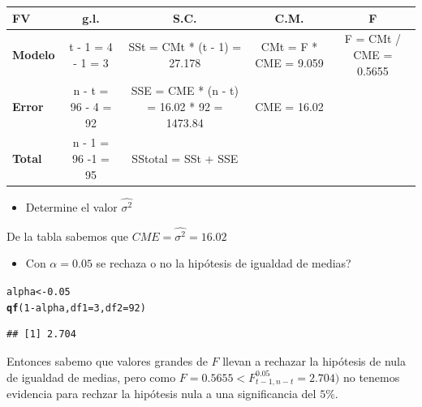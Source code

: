 \documentclass[a4paper]{scrartcl}\usepackage[]{graphicx}\usepackage[]{color}
\makeatletter
\newcommand{\hlnum}[1]{\textcolor[rgb]{0.686,0.059,0.569}{#1}}%
\newcommand{\hlopt}[1]{\textcolor[rgb]{0,0,0}{#1}}%
\newcommand{\hlstd}[1]{\textcolor[rgb]{0.345,0.345,0.345}{#1}}%
\newcommand{\hlkwb}[1]{\textcolor[rgb]{0.69,0.353,0.396}{#1}}%
\newcommand{\hlkwc}[1]{\textcolor[rgb]{0.333,0.667,0.333}{#1}}%
\newcommand{\hlkwd}[1]{\textcolor[rgb]{0.737,0.353,0.396}{\textbf{#1}}}%
\newenvironment{kframe}{%
 \def\at@end@of@kframe{}%
 \ifinner\ifhmode%
  \def\at@end@of@kframe{\end{minipage}}%
  \begin{minipage}{\columnwidth}%
 \fi\fi%
 \def\FrameCommand##1{\hskip\@totalleftmargin \hskip-\fboxsep
 \colorbox{shadecolor}{##1}\hskip-\fboxsep
     \hskip-\linewidth \hskip-\@totalleftmargin \hskip\columnwidth}%
 \MakeFramed {\advance\hsize-\width
   \@totalleftmargin\z@ \linewidth\hsize
   \@setminipage}}%
 {\par\unskip\endMakeFramed%
 \at@end@of@kframe}
\newenvironment{knitrout}{}{} %
\makeatother
\begin{document}
\begin{table}[h]
\centering
\begin{adjustbox}{max width=\textwidth}
\begin{tabular}{|l|c|c|cc}
\hline
\rowcolor[HTML]{C0C0C0} 
\textbf{FV} & \textbf{g.l.} & \textbf{S.C.} & \multicolumn{1}{c|}{\cellcolor[HTML]{C0C0C0}\textbf{C.M.}} & \multicolumn{1}{c|}{\cellcolor[HTML]{C0C0C0}\textbf{F}} \\ \hline
\cellcolor[HTML]{C0C0C0}\textbf{Modelo} & t - 1 = 4 - 1 = 3 & SSt = CMt * (t - 1) = 27.178 & \multicolumn{1}{c|}{CMt = F * CME = 9.059} & \multicolumn{1}{c|}{F = CMt / CME = 0.5655} \\ \hline
\cellcolor[HTML]{C0C0C0}\textbf{Error} & n - t = 96 - 4 = 92 & SSE = CME * (n - t) = 16.02 * 92 = 1473.84 & \multicolumn{1}{c|}{CME = 16.02} &  \\ \cline{1-4}
\cellcolor[HTML]{C0C0C0}\textbf{Total} & n - 1 = 96 -1 = 95 & SStotal = SSt + SSE &  &  \\ \cline{1-3}
\end{tabular}
\end{adjustbox}
\end{table}

\begin{itemize}
  \item Determine el valor $\hat{\sigma^2}$
\end{itemize}
De la tabla sabemos que $CME = \hat{\sigma^2} = 16.02$

\begin{itemize}
  \item Con $\alpha = 0.05$ se rechaza o no la hipótesis de igualdad de medias?
\end{itemize}
\begin{knitrout}
\color{fgcolor}\begin{kframe}
\begin{alltt}
\hlstd{alpha} \hlkwb{<-} \hlnum{0.05}
\hlkwd{qf}\hlstd{(}\hlnum{1} \hlopt{-} \hlstd{alpha,} \hlkwc{df1}\hlstd{=} \hlnum{3}\hlstd{,} \hlkwc{df2} \hlstd{=} \hlnum{92}\hlstd{)}
\end{alltt}
\begin{verbatim}
## [1] 2.704
\end{verbatim}
\end{kframe}
\end{knitrout}
Entonces sabemo que valores grandes de $F$ llevan a rechazar la hipótesis de nula de igualdad de medias, pero como $F = 0.5655 < F_{t-1, n-t}^{0.05} = 2.704)$ no tenemos evidencia para rechzar la hipótesis nula a una significancia del $5\%$.
\end{document}
